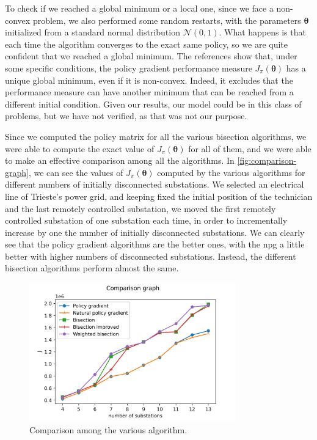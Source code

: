 To check if we reached a global minimum or a local one, since we face a non-convex problem, we also performed some random restarts, with the parameters $\boldsymbol \theta$ initialized from a standard normal distribution $\mathcal N(0,1)$. What happens is that each time the algorithm converges to the exact same policy, so we are quite confident that we reached a global minimum. The references \cite{Bhandari2019, bhandari2020note} show that, under some specific conditions, the policy gradient performance measure $J_\pi(\boldsymbol \theta)$ has a unique global minimum, even if it is non-convex. Indeed, it excludes that the performance measure can have another minimum that can be reached from a different initial condition. Given our results, our model could be in this class of problems, but we have not verified, as that was not our purpose.


Since we computed the policy matrix for all the various bisection algorithms, we were able to compute the exact value of $J_\pi (\boldsymbol \theta)$ for all of them, and we were able to make an effective comparison among all the algorithms. In \autoref{fig:comparison-graph}, we can see the values of $J_\pi(\boldsymbol \theta)$ computed by the various algorithms for different numbers of initially disconnected substations. We selected an electrical line of Trieste's power grid, and keeping fixed the initial position of the technician and the last remotely controlled substation, we moved the first remotely controlled substation of one substation each time, in order to incrementally increase by one the number of initially disconnected substations.
We can clearly see that the policy gradient algorithms are the better ones, with the \acrshort{npg} a little better with higher numbers of disconnected substations. Instead, the different bisection algorithms perform almost the same.

\begin{figure}[htb]
    \centering
    \includegraphics[width=0.8\textwidth]{chapters/figures/comparison_graph.png}
    \caption{Comparison among the various algorithm.}
    \label{fig:comparison-graph}
\end{figure}

